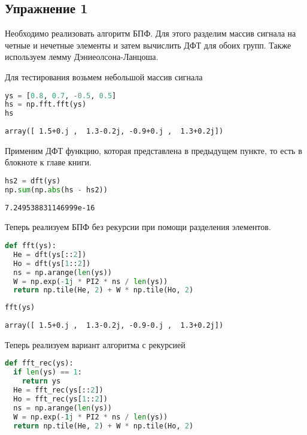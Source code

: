 \subsection{Упражнение 1}

Необходимо реализовать алгоритм БПФ. Для этого разделим массив сигнала на четные и нечетные элементы и затем вычислить ДФТ для обоих групп.
Также используем лемму Дэниеолсона-Ланцоша.

Для тестирования возьмем небольшой массив сигнала

\begin{lstlisting}[language=Python]
ys = [0.8, 0.7, -0.5, 0.5]
hs = np.fft.fft(ys)
hs
\end{lstlisting}
\begin{lstlisting}
array([ 1.5+0.j ,  1.3-0.2j, -0.9+0.j ,  1.3+0.2j])
\end{lstlisting}

Применим ДФТ функцию, которая представлена в предыдущем пункте, то есть в блокноте к главе книги.

\begin{lstlisting}[language=Python]
hs2 = dft(ys)
np.sum(np.abs(hs - hs2))
\end{lstlisting}
\begin{lstlisting}
7.249538831146999e-16
\end{lstlisting}

Теперь реализуем БПФ без рекурсии при помощи разделения элементов.

\begin{lstlisting}[language=Python]
def fft(ys):
  He = dft(ys[::2])
  Ho = dft(ys[1::2])
  ns = np.arange(len(ys))
  W = np.exp(-1j * PI2 * ns / len(ys))
  return np.tile(He, 2) + W * np.tile(Ho, 2)
\end{lstlisting}

\begin{lstlisting}[language=Python]
fft(ys)
\end{lstlisting}
\begin{lstlisting}
array([ 1.5+0.j ,  1.3-0.2j, -0.9-0.j ,  1.3+0.2j])
\end{lstlisting}

Теперь реализуем вариант алгоритма с рекурсией

\begin{lstlisting}[language=Python]
def fft_rec(ys):
  if len(ys) == 1:
    return ys
  He = fft_rec(ys[::2])
  Ho = fft_rec(ys[1::2])
  ns = np.arange(len(ys))
  W = np.exp(-1j * PI2 * ns / len(ys))
  return np.tile(He, 2) + W * np.tile(Ho, 2)
\end{lstlisting}


